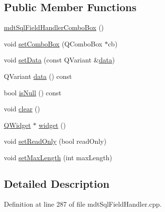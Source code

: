 \subsection*{Public Member Functions}
\begin{DoxyCompactItemize}
\item 
\hyperlink{classmdt_sql_field_handler_combo_box_ae75cf95f2e8b280bc197ca34864d9b61}{mdt\-Sql\-Field\-Handler\-Combo\-Box} ()
\item 
void \hyperlink{classmdt_sql_field_handler_combo_box_a5fdee4a52c20b137eafe7c1ae9334063}{set\-Combo\-Box} (Q\-Combo\-Box $\ast$cb)
\item 
void \hyperlink{classmdt_sql_field_handler_combo_box_ab7d68d2bc349375258a74bef3ce03865}{set\-Data} (const Q\-Variant \&\hyperlink{classmdt_sql_field_handler_combo_box_a15b82fa88972c61d88f8e207903bbdc1}{data})
\item 
Q\-Variant \hyperlink{classmdt_sql_field_handler_combo_box_a15b82fa88972c61d88f8e207903bbdc1}{data} () const 
\item 
bool \hyperlink{classmdt_sql_field_handler_combo_box_a1f6da0e68f7a6c64fffcea5d543feb04}{is\-Null} () const 
\item 
void \hyperlink{classmdt_sql_field_handler_combo_box_a7dec59b2557ac5a6fbd1d4076fe051aa}{clear} ()
\item 
\hyperlink{class_q_widget}{Q\-Widget} $\ast$ \hyperlink{classmdt_sql_field_handler_combo_box_aeebc412d63ebdf9607576304bce5ea82}{widget} ()
\item 
void \hyperlink{classmdt_sql_field_handler_combo_box_adf80f25028bb38a8ffe988d79da8087d}{set\-Read\-Only} (bool read\-Only)
\item 
void \hyperlink{classmdt_sql_field_handler_combo_box_a2085819ac0213572b07fc0bb9e79bad9}{set\-Max\-Length} (int max\-Length)
\end{DoxyCompactItemize}


\subsection{Detailed Description}


Definition at line 287 of file mdt\-Sql\-Field\-Handler.\-cpp.




